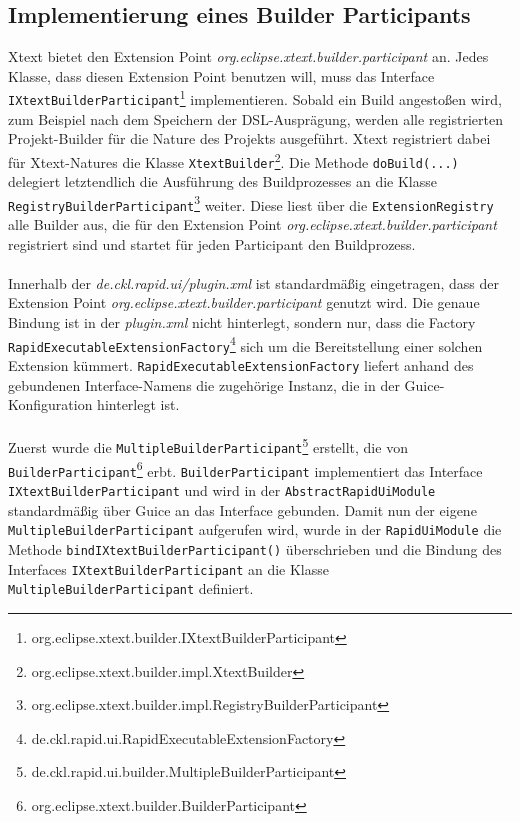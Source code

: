 \documentclass[a4paper,12pt]{scrreprt}
\begin{document}
\subsection{Implementierung eines Builder Participants}
Xtext bietet den Extension Point \emph{org.eclipse.xtext.builder.participant} an. Jedes Klasse, dass diesen Extension Point benutzen will, muss das Interface\\ \verb+IXtextBuilderParticipant+\footnote{org.eclipse.xtext.builder.IXtextBuilderParticipant} implementieren.
Sobald ein Build angestoßen wird, zum Beispiel nach dem Speichern der DSL-Ausprägung, werden alle registrierten Projekt-Builder für die Nature des Projekts ausgeführt. Xtext registriert dabei für Xtext-Natures die Klasse \verb+XtextBuilder+\footnote{org.eclipse.xtext.builder.impl.XtextBuilder}. Die Methode \verb+doBuild(...)+ delegiert letztendlich die Ausführung des Buildprozesses an die Klasse\\
\verb+RegistryBuilderParticipant+\footnote{org.eclipse.xtext.builder.impl.RegistryBuilderParticipant} weiter. Diese liest über die \verb+ExtensionRegistry+ alle Builder aus, die für den Extension Point \emph{org.eclipse.xtext.builder.participant} registriert sind und startet für jeden Participant den Buildprozess.
\\
\\
Innerhalb der \emph{de.ckl.rapid.ui/plugin.xml} ist standardmäßig eingetragen, dass der Extension Point \emph{org.eclipse.xtext.builder.participant} genutzt wird. Die genaue Bin\-dung ist in der \emph{plugin.xml} nicht hinterlegt, sondern nur, dass die Factory\\
\texttt{RapidExecutableExtensionFactory}\footnote{de.ckl.rapid.ui.RapidExecutableExtensionFactory} sich um die Bereitstellung einer solchen Extension kümmert. \verb+RapidExecutableExtensionFactory+ liefert anhand des ge\-bun\-denen Interface-Namens die zugehörige Instanz, die in der Guice-Konfiguration hinterlegt ist.
\\
\\
Zuerst wurde die \verb+MultipleBuilderParticipant+\footnote{de.ckl.rapid.ui.builder.MultipleBuilderParticipant} erstellt, die von \verb+BuilderParticipant+\footnote{org.eclipse.xtext.builder.BuilderParticipant} erbt. \verb+BuilderParticipant+ implementiert das Interface \verb+IXtextBuilderParticipant+ und wird in der \verb+AbstractRapidUiModule+ standardmäßig über Guice an das Interface gebunden.
Damit nun der eigene \verb+MultipleBuilderParticipant+ aufgerufen wird, wurde in der \verb+RapidUiModule+ die Methode \verb+bindIXtextBuilderParticipant()+ überschrieben und die Bindung des Interfaces \verb+IXtextBuilderParticipant+ an die Klasse \verb+MultipleBuilderParticipant+ definiert.
\end{document}

